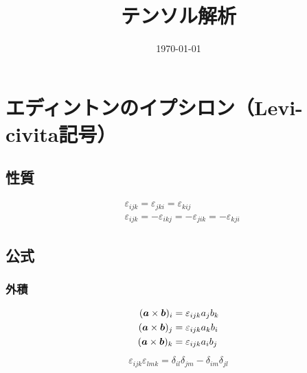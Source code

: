 \documentclass[a4paper,10pt,uplatex]{jsarticle}
\begin{document}
\title{テンソル解析}
\author{}
\date{\today}
\maketitle

\section{エディントンのイプシロン（Levi-civita記号）}
\subsection{性質}
\begin{align}
    &\varepsilon_{ijk} = \varepsilon_{jki} = \varepsilon_{kij} \\
    &\varepsilon_{ijk} = -\varepsilon_{ikj} = -\varepsilon_{jik} = -\varepsilon_{kji}
\end{align}
\subsection{公式}
\subsubsection{外積}
\begin{align}
    (\vb*{a} \times \vb*{b})_i &= \varepsilon_{ijk}a_jb_k \\
    (\vb*{a} \times \vb*{b})_j &= \varepsilon_{ijk}a_kb_i \\
    (\vb*{a} \times \vb*{b})_k &= \varepsilon_{ijk}a_ib_j 
\end{align}
\begin{align}
    \varepsilon_{ijk}\varepsilon_{lmk} = \delta_{il}\delta_{jm} - \delta_{im}\delta_{jl}
\end{align}
\end{document}
